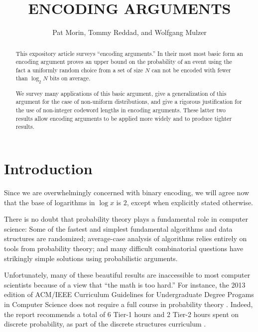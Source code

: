 \documentclass{patmorin}
\title{\MakeUppercase{Encoding Arguments}}
\author{Pat Morin, Tommy Reddad, and Wolfgang Mulzer}
\date{}
\begin{document}
\begin{titlepage}
\maketitle


\begin{abstract}
\setlength{\baselineskip}{15.84pt}
  This expository article surveys ``encoding arguments.'' In their
  most most basic form an encoding argument proves an upper bound on
  the probability of an event using the fact a uniformly random choice
  from a set of size $N$ can not be encoded with fewer than $\log_2 N$
  bits on average.

  We survey many applications of this basic argument, give a
  generalization of this argument for the case of non-uniform
  distributions, and give a rigorous justification for the use of
  non-integer codeword lengths in encoding arguments.  These latter
  two results allow encoding arguments to be applied more widely and to
  produce tighter results.
\end{abstract}


\end{titlepage}
\tableofcontents
\newpage
{}

\section{Introduction}
\setlength{\baselineskip}{15.84pt}
Since we are overwhelmingly concerned with binary encoding, we will agree now that the base of logarithms in $\log x$ is $2$, except when explicitly stated otherwise.

There is no doubt that probability theory plays a fundamental role
in computer science: Some of the fastest and simplest fundamental
algorithms and data structures are randomized; average-case analysis of
algorithms relies entirely on tools from probability theory; and many
difficult combinatorial questions have strikingly simple solutions using
probabilistic arguments.

Unfortunately, many of these beautiful results are inaccessible
to most computer scientists because of a view that ``the math
is too hard.''  For instance, the 2013 edition of ACM/IEEE
Curriculum Guidelines for Undergraduate Degree Progams in Computer
Science does not require a full course in probability theory
\cite[Page~50]{computing-curricula:computer}. Indeed, the report
recommends a total of 6 Tier-1 hours and 2 Tier-2 hours spent on
discrete probability, as part of the discrete structures curriculum
\cite[Page~77]{computing-curricula:computer}.
\end{document}
